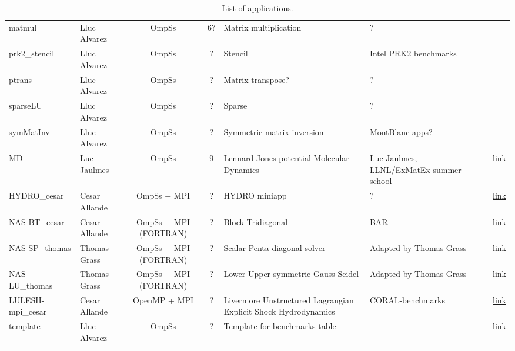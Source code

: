 \documentclass[landscape]{article}
\newcommand{\cm}{\ding{51}}%
\newcommand{\xm}{\ding{55}}%
\begin{document}
\begin{table}[h!]
{\begin{tabular}{@{}llccllcc@{}}
      {matmul                      } & Lluc Alvarez       & OmpSs                 & 6? & Matrix multiplication                      & ?                                & \xm & \\
      {prk2\_stencil               } & Lluc Alvarez       & OmpSs                 & ?  & Stencil                                    & Intel PRK2 benchmarks            & \xm & \\
      {ptrans                      } & Lluc Alvarez       & OmpSs                 & ?  & Matrix transpose?                          & ?                                & \xm & \\
      {sparseLU                    } & Lluc Alvarez       & OmpSs                 & ?  & Sparse                                     & ?                                & \xm & \\
      {symMatInv                   } & Lluc Alvarez       & OmpSs                 & ?  & Symmetric matrix inversion                 & MontBlanc apps?                  & \xm & \\
      {MD                          } & Luc Jaulmes        & OmpSs                 & 9  & Lennard-Jones potential Molecular Dynamics & Luc Jaulmes, LLNL/ExMatEx summer school & \xm & \hyperref[MD]{link}\\

      {HYDRO\_cesar                } & Cesar Allande      & OmpSs + MPI           & ?  & HYDRO miniapp                                                   & ?                        & \cm & \hyperref[hydro_cesar]{link} \\
      {NAS BT\_cesar               } & Cesar Allande      & OmpSs + MPI (FORTRAN) & ?  & Block Tridiagonal                                               & BAR                      & \cm & \hyperref[nas_bt-mz_cesar]{link} \\
      {NAS SP\_thomas              } & Thomas Grass       & OmpSs + MPI (FORTRAN) & ?  & Scalar Penta-diagonal solver                                    & Adapted by Thomas Grass  & \cm & \hyperref[nas_sp-mz_cesar]{link}\\
      {NAS LU\_thomas              } & Thomas Grass       & OmpSs + MPI (FORTRAN) & ?  & Lower-Upper symmetric Gauss Seidel                              & Adapted by Thomas Grass  & \cm & \hyperref[nas_lu-mz_cesar]{link} \\
      {LULESH-mpi\_cesar           } & Cesar Allande      & OpenMP + MPI          & ?  & Livermore Unstructured Lagrangian Explicit Shock Hydrodynamics  & CORAL-benchmarks         & \cm & \hyperref[lulesh_mpi_cesar]{link} \\


      \hline
      {template                    } & Lluc Alvarez       & OmpSs                 & ?  & Template for benchmarks table              &                                  & \xm & \hyperref[template]{link}\\
    \bottomrule
  \end{tabular}




  }
\caption{List of applications.}
\label{tab:applications}
\end{table}
\end{document}

